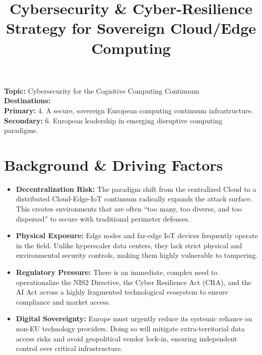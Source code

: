 \documentclass[11pt,a4paper]{article}
\title{\textbf{Cybersecurity \& Cyber-Resilience Strategy for Sovereign Cloud/Edge Computing}}
\author{}
\date{}
\begin{document}
\maketitle

\noindent \textbf{Topic:} Cybersecurity for the Cognitive Computing Continuum\\
\textbf{Destinations:}\\
\textbf{Primary:} 4. A secure, sovereign European computing continuum infrastructure.\\
\textbf{Secondary:} 6. European leadership in emerging disruptive computing paradigms.

\section{Background \& Driving Factors}
\begin{itemize}
    \item \textbf{Decentralization Risk:} The paradigm shift from the centralized Cloud to a distributed Cloud-Edge-IoT continuum radically expands the attack surface. This creates environments that are often ``too many, too diverse, and too dispersed'' to secure with traditional perimeter defenses.
    \item \textbf{Physical Exposure:} Edge nodes and far-edge IoT devices frequently operate in the field. Unlike hyperscaler data centers, they lack strict physical and environmental security controls, making them highly vulnerable to tampering.
    \item \textbf{Regulatory Pressure:} There is an immediate, complex need to operationalize the NIS2 Directive, the Cyber Resilience Act (CRA), and the AI Act across a highly fragmented technological ecosystem to ensure compliance and market access.
    \item \textbf{Digital Sovereignty:} Europe must urgently reduce its systemic reliance on non-EU technology providers. Doing so will mitigate extra-territorial data access risks and avoid geopolitical vendor lock-in, ensuring independent control over critical infrastructure.
\end{itemize}
\end{document}
